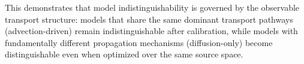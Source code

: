 This demonstrates that model indistinguishability is governed by the observable transport structure: models that share the same dominant transport pathways (advection-driven) remain indistinguishable after calibration, while models with fundamentally different propagation mechanisms (diffusion-only) become distinguishable even when optimized over the same source space.











